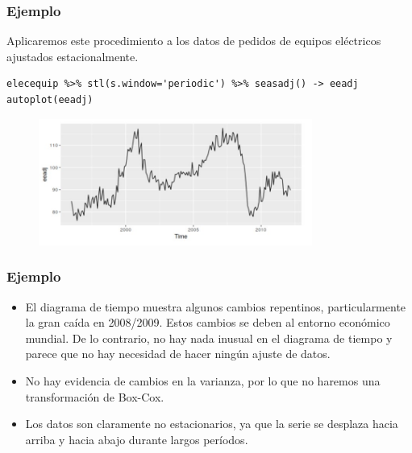 \documentclass[10pt]{beamer}
\begin{document}
\begin{frame}[fragile]
\frametitle{Ejemplo}


Aplicaremos este procedimiento a los datos de pedidos de equipos eléctricos ajustados estacionalmente.



\lstset{language=r,label= ,caption= ,captionpos=b,numbers=none}
\begin{lstlisting}
elecequip %>% stl(s.window='periodic') %>% seasadj() -> eeadj
autoplot(eeadj)
\end{lstlisting}

\pause


\begin{figure}
\begin{center}
    \includegraphics[width=0.8\textwidth]{Imagen16.JPG}
\end{center}
\end{figure}




\end{frame}






\begin{frame}[fragile]
\frametitle{Ejemplo}


\begin{itemize}
\item El diagrama de tiempo muestra algunos cambios repentinos, particularmente la gran caída en 2008/2009. Estos cambios se deben al entorno económico mundial. De lo contrario, no hay nada inusual en el diagrama de tiempo y parece que no hay necesidad de hacer ningún ajuste de datos.
\vspace{3mm}

\item No hay evidencia de cambios en la varianza, por lo que no haremos una transformación de Box-Cox.
\vspace{3mm}
\item Los datos son claramente no estacionarios, ya que la serie se desplaza hacia arriba y hacia abajo durante largos períodos. 
\end{itemize}

\end{frame}
\end{document}
